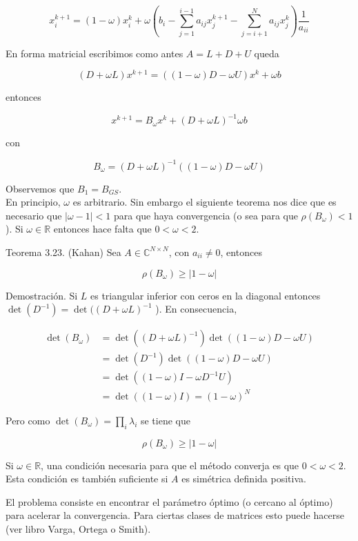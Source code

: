 \documentclass[10pt]{book}
\begin{document}
$$
x_{i}^{k+1}=(1-\omega) x_{i}^{k}+\omega\left(b_{i}-\sum_{j=1}^{i-1} a_{i j} x_{j}^{k+1}-\sum_{j=i+1}^{N} a_{i j} x_{j}^{k}\right) \frac{1}{a_{i i}}
$$

En forma matricial escribimos como antes $A=L+D+U$ queda

$$
(D+\omega L) x^{k+1}=((1-\omega) D-\omega U) x^{k}+\omega b
$$

entonces

$$
x^{k+1}=B_{\omega} x^{k}+(D+\omega L)^{-1} \omega b
$$

con

$$
B_{\omega}=(D+\omega L)^{-1}((1-\omega) D-\omega U)
$$

Observemos que $B_{1}=B_{G S}$.\\
En principio, $\omega$ es arbitrario. Sin embargo el siguiente teorema nos dice que es necesario que $|\omega-1|<1$ para que haya convergencia (o sea para que $\rho\left(B_{\omega}\right)<1$ ). Si $\omega \in \mathbb{R}$ entonces hace falta que $0<\omega<2$.

Teorema 3.23. (Kahan) Sea $A \in \mathbb{C}^{N \times N}$, con $a_{i i} \neq 0$, entonces

$$
\rho\left(B_{\omega}\right) \geq|1-\omega|
$$

Demostración. Si $L$ es triangular inferior con ceros en la diagonal entonces $\operatorname{det}\left(D^{-1}\right)=\operatorname{det}((D+ \omega L)^{-1}$ ). En consecuencia,

$$
\begin{aligned}
\operatorname{det}\left(B_{\omega}\right) & =\operatorname{det}\left((D+\omega L)^{-1}\right) \operatorname{det}((1-\omega) D-\omega U) \\
& =\operatorname{det}\left(D^{-1}\right) \operatorname{det}((1-\omega) D-\omega U) \\
& =\operatorname{det}\left((1-\omega) I-\omega D^{-1} U\right) \\
& =\operatorname{det}((1-\omega) I)=(1-\omega)^{N}
\end{aligned}
$$

Pero como $\operatorname{det}\left(B_{\omega}\right)=\prod_{i} \lambda_{i}$ se tiene que

$$
\rho\left(B_{\omega}\right) \geq|1-\omega|
$$

Si $\omega \in \mathbb{R}$, una condición necesaria para que el método converja es que $0<\omega<2$. Esta condición es también suficiente si $A$ es simétrica definida positiva.

El problema consiste en encontrar el parámetro óptimo (o cercano al óptimo) para acelerar la convergencia. Para ciertas clases de matrices esto puede hacerse (ver libro Varga, Ortega o Smith).
\end{document}

